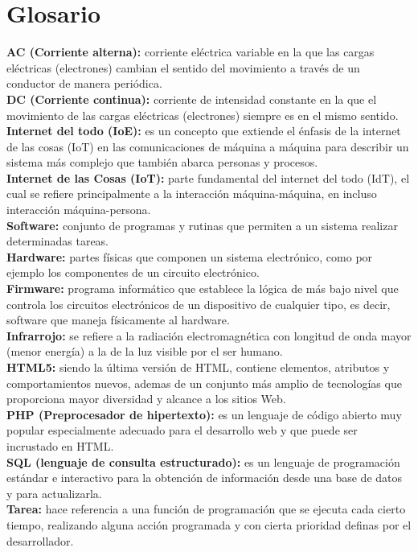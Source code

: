 \chapter*{Glosario}

\textbf{AC (Corriente alterna):} corriente eléctrica variable en la que las cargas eléctricas (electrones) cambian el sentido del movimiento a través de un conductor de manera periódica.\\

\textbf{DC (Corriente continua):} corriente de intensidad constante en la que el movimiento de las cargas eléctricas (electrones) siempre es en el mismo sentido.\\

\textbf{Internet del todo (IoE):} es un concepto que extiende el énfasis de la internet de las cosas (IoT) en las comunicaciones de máquina a máquina para describir un sistema más complejo que también abarca personas y procesos.\cite{IOE} \\

\textbf{Internet de las Cosas (IoT):} parte fundamental del internet del todo (IdT), el cual se refiere principalmente a la interacción máquina-máquina, en incluso interacción máquina-persona.\\

\textbf{Software:} conjunto de programas y rutinas que permiten a un sistema realizar determinadas tareas.\\

\textbf{Hardware:} partes físicas que componen un sistema electrónico, como por ejemplo los componentes de un circuito electrónico.\\

\textbf{Firmware:} programa informático que establece la lógica de más bajo nivel que controla los circuitos electrónicos de un dispositivo de cualquier tipo, es decir, software que maneja físicamente al hardware.\\

\textbf{Infrarrojo:} se refiere a la radiación electromagnética con longitud de onda mayor (menor energía) a la de la luz visible por el ser humano.\\

\textbf{HTML5:} siendo la última versión de HTML, contiene elementos, atributos y comportamientos nuevos, ademas de un conjunto más amplio de tecnologías que proporciona mayor diversidad y alcance a los sitios Web. \\

\textbf{PHP (Preprocesador de hipertexto):} es un lenguaje de código abierto muy popular especialmente adecuado para el desarrollo web y que puede ser incrustado en HTML.\\

\textbf{SQL (lenguaje de consulta estructurado):} es un lenguaje de programación estándar e interactivo para la obtención de información desde una base de datos y para actualizarla.\\

\textbf{Tarea:} hace referencia a una función de programación que se ejecuta cada cierto tiempo, realizando alguna acción programada y con cierta prioridad definas por el desarrollador.
